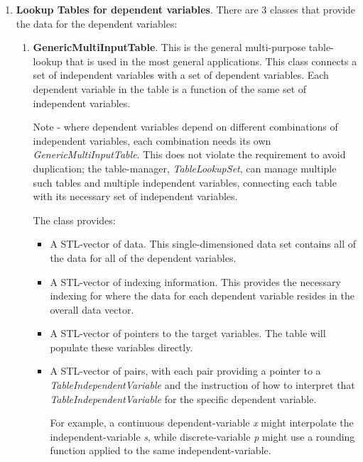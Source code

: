\documentclass[11pt,fleqn]{report}
\begin{document}
\begin{enumerate}
    Note that for monotonically increasing data, \textit{Prev} and
    \textit{Floor} are equivalent, as are \textit{Next} and \textit{Ceil}.
    However, for monotonically decreasing data, \textit{Prev} is equivalent to
    \textit{Ceil}, while \textit{Next} is equivalent to \textit{Floor}.
    Thus, two of these options may be considered redundant if the structure
    of the independent variable data-set is already known.

  \item \textbf{Lookup Tables for dependent variables}.  There are 3 classes
  that provide the data for the dependent variables:
  \begin{enumerate}
   \item \textbf{GenericMultiInputTable}.  This is the general multi-purpose
    table-lookup that is used in the most general applications.
    This class connects
    a set of independent variables with a set of dependent variables.  Each
    dependent variable in the table is a function of the same set of
    independent variables.

    Note - where dependent variables depend on different combinations of
    independent variables, each combination needs its own
    \textit{GenericMultiInputTable}.  This does not violate the requirement to
    avoid duplication; the table-manager, \textit{TableLookupSet}, can manage
    multiple such tables and multiple independent variables, connecting each
    table with its necessary set of independent variables.

    The class provides:
    \begin{itemize}
     \item A STL-vector of data.  This single-dimensioned data set contains
      all of the data for all of the dependent variables.
     \item A STL-vector of indexing information.  This provides the necessary
      indexing for where the data for each dependent variable resides in the
      overall data vector.
     \item A STL-vector of pointers to the target variables.
      The table will populate these variables directly.
     \item A STL-vector of pairs, with each pair providing a pointer to a
     \textit{TableIndependentVariable} and the instruction of how to
     interpret that \textit{TableIndependentVariable} for the specific
     dependent variable.

     For example, a continuous dependent-variable \textit{x} might
     interpolate the independent-variable \textit{s}, while discrete-variable
     \textit{p} might use a rounding function applied to the same
     independent-variable.
    \end{itemize}


\end{enumerate}
\end{enumerate}
\end{document}
